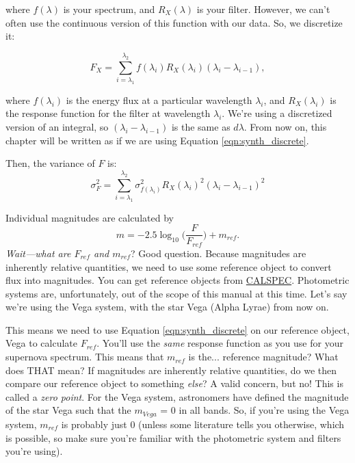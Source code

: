 where $f(\lambda)$ is your spectrum, and $R_{X}(\lambda)$ is your filter. However, we can't often use the continuous version of this function with our data. So, we discretize it:

\begin{equation}
    F_{X} = \sum_{i=\lambda_{1}}^{\lambda_{2}} f(\lambda_{i}) R_{X}(\lambda_{i})(\lambda_{i} - \lambda_{i-1}),
\label{eqn:synth_discrete}
\end{equation}

where $f(\lambda_{i})$ is the energy flux at a particular wavelength $\lambda_{i}$, and $R_{X}(\lambda_{i})$ is the response function for the filter at wavelength $\lambda_{i}$. We're using a discretized version of an integral, so $(\lambda_{i} - \lambda_{i-1})$ is the same as $d\lambda$. From now on, this chapter will be written as if we are using Equation \ref{eqn:synth_discrete}.

Then, the variance of $F$ is:
\begin{equation}
    \sigma_{F}^{2} = \sum_{i=\lambda_{1}}^{\lambda_{2}} \sigma_{f(\lambda_{i})}^{2} R_{X}(\lambda_{i})^{2}(\lambda_{i} - \lambda_{i-1})^{2}
\end{equation}

Individual magnitudes are calculated by
\begin{equation}
    m = -2.5\log_{10}\Big(\frac{F}{F_{ref}}\Big) + m_{ref}.
\end{equation}
\textit{Wait---what are $F_{ref}$ and $m_{ref}$}? Good question. Because magnitudes are inherently relative quantities, we need to use some reference object to convert flux into magnitudes. You can get reference objects from \href{https://www.stsci.edu/hst/instrumentation/reference-data-for-calibration-and-tools/astronomical-catalogs/calspec}{CALSPEC}. Photometric systems are, unfortunately, out of the scope of this manual at this time. Let's say we're using the Vega system, with the star Vega (Alpha Lyrae) from now on. 

This means we need to use Equation \ref{eqn:synth_discrete} on our reference object, Vega to calculate $F_{ref}$. You'll use the \textit{same} response function as you use for your supernova spectrum. This means that $m_{ref}$ is the... reference magnitude? What does THAT mean? If magnitudes are inherently relative quantities, do we then compare our reference object to something \textit{else}? A valid concern, but no! This is called a \textit{zero point}. For the Vega system, astronomers have defined the magnitude of the star Vega such that the $m_{Vega}$ = 0 in all bands. So, if you're using the Vega system, $m_{ref}$ is probably just 0 (unless some literature tells you otherwise, which is possible, so make sure you're familiar with the photometric system and filters you're using).

